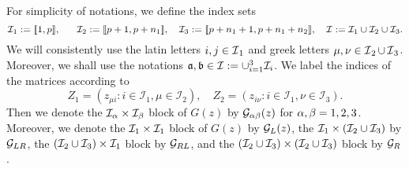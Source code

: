 \documentclass{article}
\begin{document}
For simplicity of notations, we define the index sets
$$\cal I_1:=\llbracket 1,p\rrbracket, \ \quad \ \cal I_2:=\llbracket p+1,p+n_1\rrbracket, \quad \cal I_3:=\llbracket p+n_1+1,p+n_1+n_2\rrbracket ,\quad \cal I:=\cal I_1\cup \cal I_2 \cup \cal I_3.$$
 We will consistently use the latin letters $i,j\in\sI_{1}$ and greek letters $\mu,\nu\in\sI_{2}\cup \sI_{3}$. Moreover, we shall use the notations $\fa,\fb\in \cal I:=\cup_{i=1}^3 \cal I_i$. We label the indices of the matrices according to
 $$Z_1= (z_{\mu i}:i\in \mathcal I_1, \mu \in \mathcal I_2), \quad Z_2= (z_{i\nu}:i\in \mathcal I_1, \nu \in \mathcal I_3).$$
Then we denote the $\cal I_\al \times \cal I_\beta$ block of $ G(z)$ by $ \cal G_{\al\beta}(z)$ for $\al,\beta=1,2,3$. Moreover,  we denote the $\cal I_1 \times \cal I_1$ block of $ G(z)$ by $ \cal G_{L}(z)$, the $\cal I_1 \times (\cal I_2 \cup \cal I_3)$ by $\cal G_{LR}$, the $ (\cal I_2 \cup \cal I_3)\times \cal I_1$ block by $\cal G_{RL}$, and the $ (\cal I_2 \cup \cal I_3)\times (\cal I_2 \cup \cal I_3)$ block by $\cal G_R$. 
\end{document}
